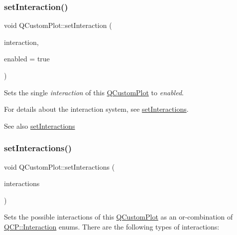 \subsubsection{\texorpdfstring{set\+Interaction()}{setInteraction()}}
{\footnotesize\ttfamily void Q\+Custom\+Plot\+::set\+Interaction (\begin{DoxyParamCaption}\item[{const \mbox{\hyperlink{namespace_q_c_p_a2ad6bb6281c7c2d593d4277b44c2b037}{Q\+C\+P\+::\+Interaction}} \&}]{interaction,  }\item[{bool}]{enabled = {\ttfamily true} }\end{DoxyParamCaption})}

Sets the single {\itshape interaction} of this \mbox{\hyperlink{class_q_custom_plot}{Q\+Custom\+Plot}} to {\itshape enabled}.

For details about the interaction system, see \mbox{\hyperlink{class_q_custom_plot_a5ee1e2f6ae27419deca53e75907c27e5}{set\+Interactions}}.

\begin{DoxySeeAlso}{See also}
\mbox{\hyperlink{class_q_custom_plot_a5ee1e2f6ae27419deca53e75907c27e5}{set\+Interactions}} 
\end{DoxySeeAlso}
\mbox{\label{class_q_custom_plot_a5ee1e2f6ae27419deca53e75907c27e5}} 
\subsubsection{\texorpdfstring{set\+Interactions()}{setInteractions()}}
{\footnotesize\ttfamily void Q\+Custom\+Plot\+::set\+Interactions (\begin{DoxyParamCaption}\item[{const Q\+C\+P\+::\+Interactions \&}]{interactions }\end{DoxyParamCaption})}

Sets the possible interactions of this \mbox{\hyperlink{class_q_custom_plot}{Q\+Custom\+Plot}} as an or-\/combination of \mbox{\hyperlink{namespace_q_c_p_a2ad6bb6281c7c2d593d4277b44c2b037}{Q\+C\+P\+::\+Interaction}} enums. There are the following types of interactions\+:

